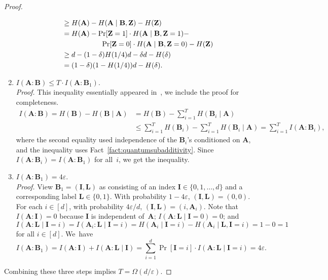 \documentclass[twoside,11pt]{article}
\newcommand{\eps}{\varepsilon}
\def\01{\{0,1\}}
\begin{document}
\begin{proof}
\begin{enumerate}
\begin{align*}
		&  \geq H(\mathbf{A})-H(\mathbf{A}\mid \mathbf{B},\mathbf{Z})-H(\mathbf{Z})\\ 
		& = H(\mathbf{A})-\Pr[\mathbf{Z}=1]\cdot H(\mathbf{A}\mid \mathbf{B},\mathbf{Z}=1)-\\
		& \hspace{55 pt}\Pr[\mathbf{Z}=0]\cdot H(\mathbf{A}\mid\mathbf{B},\mathbf{Z}=0) - H(\mathbf{Z})\\
		& \geq d-(1-\delta)H(1/4)d - \delta d - H(\delta)\\
		& = (1-\delta)(1-H(1/4))d - H(\delta).
		\end{align*}
		\item $I(\mathbf{A}:\mathbf{B})\leq T\cdot I(\mathbf{A}:\mathbf{B}_1)$.\\[2mm]
		\emph{Proof.} This inequality essentially appeared in~\cite[Lemma~5]{jain&zhang:newoneway}, we include the proof for completeness.
		\begin{align*}
		I(\mathbf{A}:\mathbf{B}) = H(\mathbf{B})- H(\mathbf{B}\mid \mathbf{A}) 
		&= H(\mathbf{B})- \sum_{i=1}^T H(\mathbf{B}_i\mid \mathbf{A})\\
		&\leq \sum_{i=1}^T H(\mathbf{B}_i) - \sum_{i=1}^T H(\mathbf{B}_i\mid \mathbf{A})
		= \sum_{i=1}^T I(\mathbf{A}:\mathbf{B}_i),
		\end{align*}
		where the second equality used independence of the $\mathbf{B}_i$'s conditioned on $\mathbf{A}$, and the inequality uses Fact~\ref{fact:quantumsubadditivity}.
		Since $I(\mathbf{A}:\mathbf{B}_i)=I(\mathbf{A}:\mathbf{B}_1)$ for all~$i$, we get the inequality.
		\item $I(\mathbf{A}:\mathbf{B}_1)=4\eps$.\\[2mm]
		\emph{Proof.} View $\mathbf{B}_1=(\mathbf{I},\mathbf{L})$ as consisting of an index $\mathbf{I}\in\{0,1,\ldots,d\}$ and a corresponding label $\mathbf{L}\in\01$. With probability $1-4\eps$, $(\mathbf{I},\mathbf{L})=(0,0)$. For each $i\in[d]$, with probability $4\eps/d$, $(\mathbf{I},\mathbf{L})=(i,\mathbf{A}_i)$. Note that $I(\mathbf{A}:\mathbf{I})=0$ because $\mathbf{I}$ is independent of~$\mathbf{A}$; $I(\mathbf{A}:\mathbf{L}\mid\mathbf{I}=0)=0$; and $I(\mathbf{A}:\mathbf{L}\mid \mathbf{I}=i)=I(\mathbf{A}_i:\mathbf{L}\mid\mathbf{I}=i)=H(\mathbf{A}_i\mid\mathbf{I}=i)-H(\mathbf{A}_i\mid \mathbf{L},\mathbf{I}=i)=1-0=1$ for all $i\in[d]$. We~have 
		$$
		I(\mathbf{A}:\mathbf{B}_1)=I(\mathbf{A}:\mathbf{I})+I(\mathbf{A}:\mathbf{L}\mid\mathbf{I})=\sum_{i=1}^d \Pr[\mathbf{I}=i]\cdot I(\mathbf{A}:\mathbf{L}\mid\mathbf{I}=i)=4\eps.
		$$
	\end{enumerate}
	Combining these three steps implies $T=\Omega(d/\eps)$.
\end{proof}
\end{document}
